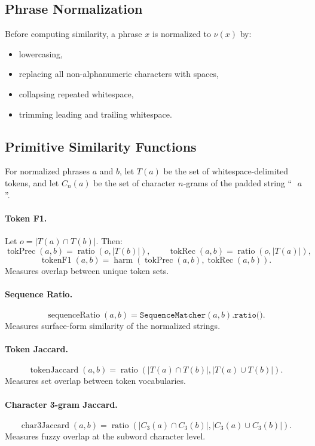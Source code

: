 \documentclass[11pt]{article}
\begin{document}
\subsection{Phrase Normalization}
Before computing similarity, a phrase $x$ is normalized to $\nu(x)$ by:
\begin{itemize}[leftmargin=*]
\item lowercasing,
\item replacing all non-alphanumeric characters with spaces,
\item collapsing repeated whitespace,
\item trimming leading and trailing whitespace.
\end{itemize}

\subsection{Primitive Similarity Functions}
For normalized phrases $a$ and $b$, let $T(a)$ be the set of whitespace-delimited tokens, and let $C_n(a)$ be the set of character $n$-grams of the padded string ``\verb| |\,$a$\,\verb| |''.

\paragraph{Token F1.}
Let $o = |T(a)\cap T(b)|$. Then:
\[
\operatorname{tokPrec}(a,b)=\operatorname{ratio}(o,|T(b)|),\qquad
\operatorname{tokRec}(a,b)=\operatorname{ratio}(o,|T(a)|),
\]
\[
\operatorname{tokenF1}(a,b)=\operatorname{harm}(\operatorname{tokPrec}(a,b),\operatorname{tokRec}(a,b)).
\]
Measures overlap between unique token sets.

\paragraph{Sequence Ratio.}
\[
\operatorname{sequenceRatio}(a,b)=\texttt{SequenceMatcher}(a,b).\texttt{ratio()}.
\]
Measures surface-form similarity of the normalized strings.

\paragraph{Token Jaccard.}
\[
\operatorname{tokenJaccard}(a,b)=\operatorname{ratio}(|T(a)\cap T(b)|,|T(a)\cup T(b)|).
\]
Measures set overlap between token vocabularies.

\paragraph{Character 3-gram Jaccard.}
\[
\operatorname{char3Jaccard}(a,b)=\operatorname{ratio}(|C_3(a)\cap C_3(b)|,|C_3(a)\cup C_3(b)|).
\]
Measures fuzzy overlap at the subword character level.
\end{document}
